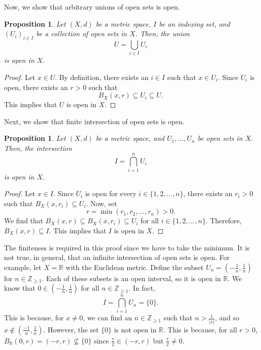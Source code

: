 \documentclass[a4paper, openany]{memoir}
\theoremstyle{definition}
\theoremstyle{plain}
\newtheorem{proposition}[definition]{Proposition}
\begin{document}
Now, we show that arbitrary unions of open sets is open.
\begin{proposition}
Let $(X, d)$ be a metric space, $I$ be an indexing set, and $(U_i)_{i \in I}$ be a collection of open sets in $X$. Then, the union
\[U = \bigcup_{i \in I} U_i\]
is open in $X$.
\end{proposition}
\begin{proof}
Let $x \in U$. By definition, there exists an $i \in I$ such that $x \in U_i$. Since $U_i$ is open, there exists an $r > 0$ such that
\[B_X(x, r) \subseteq U_i \subseteq U.\]
This implies that $U$ is open in $X$.
\end{proof}
\noindent Next, we show that finite intersection of open sets is open.
\begin{proposition}
Let $(X, d)$ be a metric space, and $U_1, \dots, U_n$ be open sets in $X$. Then, the intersection
\[I = \bigcap_{i=1}^n U_i\]
is open in $X$.
\end{proposition}
\begin{proof}
Let $x \in I$. Since $U_i$ is open for every $i \in \{1, 2, \dots, n\}$, there exists an $r_i > 0$ such that $B_X(x, r_i) \subseteq U_i$. Now, set
\[r = \min(r_1, r_2, \dots, r_n) > 0.\]
We find that $B_X(x, r) \subseteq B_X(x, r_i) \subseteq U_i$ for all $i \in \{1, 2, \dots, n\}$. Therefore, $B_X(x, r) \subseteq I$. This implies that $I$ is open in $X$.
\end{proof}
\noindent The finiteness is required in this proof since we have to take the minimum. It is not true, in general, that an infinite intersection of open sets is open. For example, let $X = \mathbb{R}$ with the Euclidean metric. Define the subset $U_n = (-\frac{1}{n}, \frac{1}{n})$ for $n \in \mathbb{Z}_{\geqslant 1}$. Each of these subsets is an open interval, so it is open in $\mathbb{R}$. We know that $0 \in (-\frac{1}{n}, \frac{1}{n})$ for all $n \in \mathbb{Z}_{\geqslant 1}$. In fact,
\[I = \bigcap_{i=1}^n U_n = \{0\}.\]
This is because, for $x \neq 0$, we can find an $n \in \mathbb{Z}_{\geqslant 1}$ such that $n > \frac{1}{|x|}$, and so $x \not\in (\frac{-1}{n}, \frac{1}{n})$. However, the set $\{0\}$ is not open in $\mathbb{R}$. This is because, for all $r > 0$, $B_{\mathbb{R}}(0, r) = (-r, r) \not\subseteq \{0\}$ since $\frac{r}{2} \in (-r, r)$ but $\frac{r}{2} \neq 0$.
\end{document}

